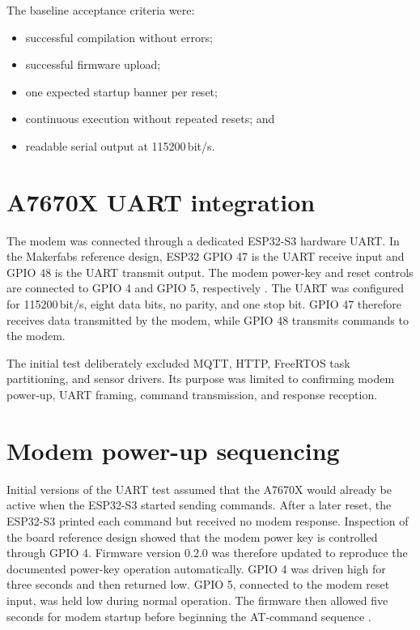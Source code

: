 The baseline acceptance criteria were:
\begin{itemize}
\item successful compilation without errors;
\item successful firmware upload;
\item one expected startup banner per reset;
\item continuous execution without repeated resets; and
\item readable serial output at 115200\,bit/s.
\end{itemize}

\section{A7670X UART integration}

The modem was connected through a dedicated ESP32-S3 hardware UART. In the Makerfabs reference design, ESP32 GPIO 47 is the UART receive input and GPIO 48 is the UART transmit output. The modem power-key and reset controls are connected to GPIO 4 and GPIO 5, respectively \cite{makerfabsa7670x}. The UART was configured for 115200\,bit/s, eight data bits, no parity, and one stop bit. GPIO 47 therefore receives data transmitted by the modem, while GPIO 48 transmits commands to the modem.

The initial test deliberately excluded MQTT, HTTP, FreeRTOS task partitioning, and sensor drivers. Its purpose was limited to confirming modem power-up, UART framing, command transmission, and response reception.

\section{Modem power-up sequencing}
\label{sec:modem-power}

Initial versions of the UART test assumed that the A7670X would already be active when the ESP32-S3 started sending commands. After a later reset, the ESP32-S3 printed each command but received no modem response. Inspection of the board reference design showed that the modem power key is controlled through GPIO 4. Firmware version 0.2.0 was therefore updated to reproduce the documented power-key operation automatically. GPIO 4 was driven high for three seconds and then returned low. GPIO 5, connected to the modem reset input, was held low during normal operation. The firmware then allowed five seconds for modem startup before beginning the AT-command sequence \cite{makerfabsa7670x}.

